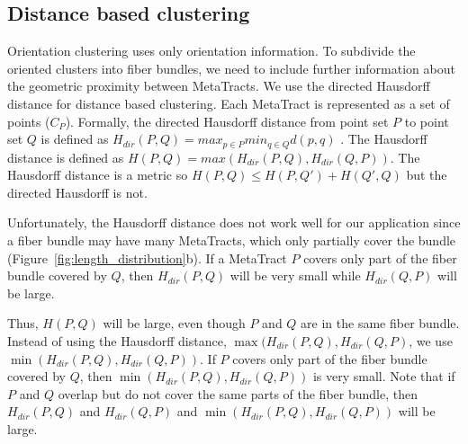   
\subsection{Distance based clustering}
 \label{subsec:dist_clustering}
Orientation clustering uses only orientation information. To subdivide the oriented clusters into fiber bundles, we need to include further information about the geometric proximity between MetaTracts. We use the directed Hausdorff distance for distance based clustering.
Each MetaTract is represented as a set of points ($C_P$). Formally, the directed Hausdorff distance from point set $P$ to point set $Q$ is defined as 
$H_{dir}(P,Q) = max_{p \in P} min_{q \in Q} d(p,q)$ .
The Hausdorff distance is defined as $H(P,Q) = max(H_{dir}(P,Q),H_{dir}(Q,P))$.
The Hausdorff distance is a metric so $H(P,Q) \le H(P,Q') + H(Q',Q)$ but the directed Hausdorff is not.

Unfortunately, the Hausdorff distance does not work well for our application since a fiber bundle may have many MetaTracts, which only partially cover the bundle (Figure~\ref{fig:length_distribution}b). If a MetaTract $P$ covers only part of the fiber bundle covered by $Q$, then $H_{dir}(P,Q)$ will be very small while $H_{dir}(Q,P)$ will be large.

Thus, $H(P,Q)$ will be large, even though $P$ and $Q$ are in the same fiber bundle.
Instead of using the Hausdorff distance, $\max(H_{dir}(P,Q),H_{dir}(Q,P)$, we use $\min(H_{dir}(P,Q),H_{dir}(Q,P))$. If $P$ covers only part of the fiber bundle covered by $Q$, then $\min(H_{dir}(P,Q),H_{dir}(Q,P))$ is very small.
Note that if $P$ and $Q$ overlap but do not cover the same parts of the fiber bundle, then $H_{dir}(P,Q)$ and $H_{dir}(Q,P)$ and $\min(H_{dir}(P,Q),H_{dir}(Q,P))$ will be large.
 
